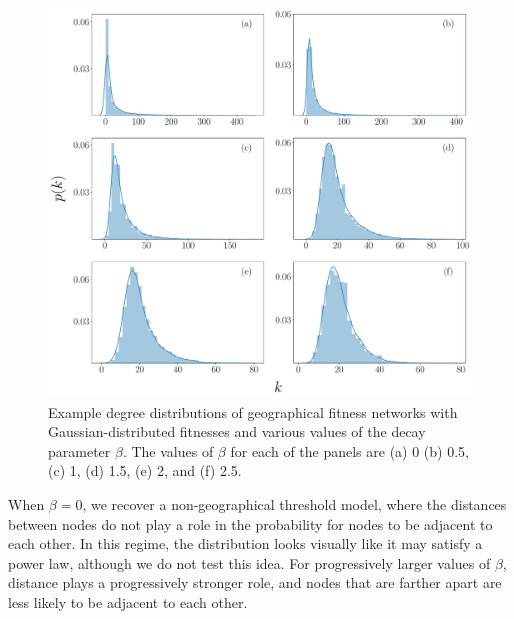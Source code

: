 \documentclass[%
 reprint,
 amsmath,amssymb,
 aps,
]{revtex4-1}
\begin{document}
\begin{figure}
    \centering
    \includegraphics[width=0.7\linewidth]{geographical_degree_distribution3.pdf}
    \caption{Example degree distributions of geographical fitness networks with Gaussian-distributed fitnesses and various values of the decay parameter $\beta$. The values of $\beta$ for each of the panels are (a) 0 (b) 0.5, (c) 1, (d) 1.5, (e) 2, and (f) 2.5.
    }
\end{figure}


When $\beta = 0$, we recover a non-geographical threshold model, where the distances between nodes do not play a role in the probability for nodes to be adjacent to each other. In this regime, the distribution looks visually like it may satisfy a power law, although we do not test this idea. For progressively larger values of $\beta$, distance plays a progressively stronger role, and nodes that are farther apart are less likely to be adjacent to each other.
\end{document}
